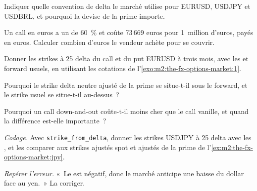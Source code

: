 \begin{exercise}[$\star$]\label{exo:m2:the-fx-options-market:2}
Indiquer quelle convention de delta le marché utilise pour EURUSD, USDJPY et USDBRL, et
pourquoi la devise de la prime importe.
\end{exercise}

\begin{exercise}[$\star$]\label{exo:m2:the-fx-options-market:3}
Un call en euros a un  de 60~\% et coûte 73\,669 euros pour
1~million d'euros, payés en euros. Calculer combien d'euros le vendeur achète pour se couvrir.
\end{exercise}

\begin{exercise}[$\star\star$]\label{exo:m2:the-fx-options-market:4}
Donner les strikes à 25 delta du call et du put EURUSD à trois mois, avec les  et
forward usuels, en utilisant les cotations de l'\cref{exo:m2:the-fx-options-market:1}.
\end{exercise}

\begin{exercise}[$\star\star$]\label{exo:m2:the-fx-options-market:5}
Pourquoi le strike delta neutre ajusté de la prime se situe-t-il sous le forward, et le
strike usuel se situe-t-il au-dessus~?
\end{exercise}

\begin{exercise}[$\star\star$]\label{exo:m2:the-fx-options-market:6}
Pourquoi un call down-and-out coûte-t-il moins cher que le call vanille, et quand la
différence est-elle importante~?
\end{exercise}

\begin{exercise}[$\star\star\star$]\label{exo:m2:the-fx-options-market:7}
\emph{Codage.} Avec \texttt{strike\_from\_delta}, donner les strikes USDJPY à 25 delta
avec les , et les comparer aux strikes ajustés spot et ajustés de la prime de
l'\cref{ex:m2:the-fx-options-market:jpy}.
\end{exercise}

\begin{exercise}[$\star\star\star$]\label{exo:m2:the-fx-options-market:8}
\emph{Repérer l'erreur.} «~Le  est négatif, donc le marché anticipe une baisse
du dollar face au yen.~» La corriger.
\end{exercise}

